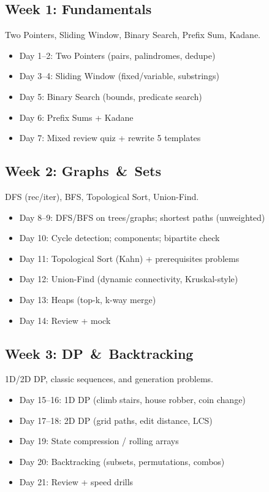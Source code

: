 \documentclass[11pt]{article}
\begin{document}
\subsection*{Week 1: Fundamentals}
Two Pointers, Sliding Window, Binary Search, Prefix Sum, Kadane.
\begin{itemize}[leftmargin=1.2em]
  \item Day 1--2: Two Pointers (pairs, palindromes, dedupe)
  \item Day 3--4: Sliding Window (fixed/variable, substrings)
  \item Day 5: Binary Search (bounds, predicate search)
  \item Day 6: Prefix Sums + Kadane
  \item Day 7: Mixed review quiz + rewrite 5 templates
\end{itemize}

\subsection*{Week 2: Graphs \,\& \,Sets}
DFS (rec/iter), BFS, Topological Sort, Union-Find.
\begin{itemize}[leftmargin=1.2em]
  \item Day 8--9: DFS/BFS on trees/graphs; shortest paths (unweighted)
  \item Day 10: Cycle detection; components; bipartite check
  \item Day 11: Topological Sort (Kahn) + prerequisites problems
  \item Day 12: Union-Find (dynamic connectivity, Kruskal-style)
  \item Day 13: Heaps (top-k, k-way merge)
  \item Day 14: Review + mock
\end{itemize}

\subsection*{Week 3: DP \,\& \,Backtracking}
1D/2D DP, classic sequences, and generation problems.
\begin{itemize}[leftmargin=1.2em]
  \item Day 15--16: 1D DP (climb stairs, house robber, coin change)
  \item Day 17--18: 2D DP (grid paths, edit distance, LCS)
  \item Day 19: State compression / rolling arrays
  \item Day 20: Backtracking (subsets, permutations, combos)
  \item Day 21: Review + speed drills
\end{itemize}
\end{document}
